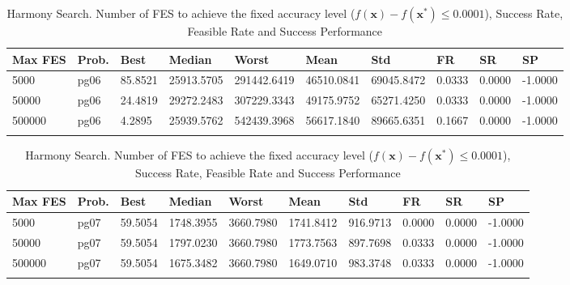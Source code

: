 \documentclass[10pt, a4paper]{book}
\begin{document}
\begin{center}
\begin{longtable}{l l l l l l l l l l}
\textbf{Max FES} & \textbf{Prob.} & \textbf{Best} & \textbf{Median} & \textbf{Worst} & \textbf{Mean} & \textbf{Std} & \textbf{FR} & \textbf{SR} & \textbf{SP} \\
\hline
5000 & pg06 & 85.8521 & 25913.5705 & 291442.6419 & 46510.0841 & 69045.8472 & 0.0333 & 0.0000 & -1.0000 \\
50000 & pg06 & 24.4819 & 29272.2483 & 307229.3343 & 49175.9752 & 65271.4250 & 0.0333 & 0.0000 & -1.0000 \\
500000 & pg06 & 4.2895 & 25939.5762 & 542439.3968 & 56617.1840 & 89665.6351 & 0.1667 & 0.0000 & -1.0000 \\

\caption{ Harmony Search. Number of FES to achieve the fixed accuracy level ($f(\mathbf{x}) - f(\mathbf{x}^{*}) \leq 0.0001$), Success Rate, Feasible Rate and Success Performance }
\end{longtable}
\end{center}

\begin{center}
\begin{longtable}{l l l l l l l l l l}
\textbf{Max FES} & \textbf{Prob.} & \textbf{Best} & \textbf{Median} & \textbf{Worst} & \textbf{Mean} & \textbf{Std} & \textbf{FR} & \textbf{SR} & \textbf{SP} \\
\hline
5000 & pg07 & 59.5054 & 1748.3955 & 3660.7980 & 1741.8412 & 916.9713 & 0.0000 & 0.0000 & -1.0000 \\
50000 & pg07 & 59.5054 & 1797.0230 & 3660.7980 & 1773.7563 & 897.7698 & 0.0333 & 0.0000 & -1.0000 \\
500000 & pg07 & 59.5054 & 1675.3482 & 3660.7980 & 1649.0710 & 983.3748 & 0.0333 & 0.0000 & -1.0000 \\

\caption{ Harmony Search. Number of FES to achieve the fixed accuracy level ($f(\mathbf{x}) - f(\mathbf{x}^{*}) \leq 0.0001$), Success Rate, Feasible Rate and Success Performance }
\end{longtable}
\end{center}
\end{document}
